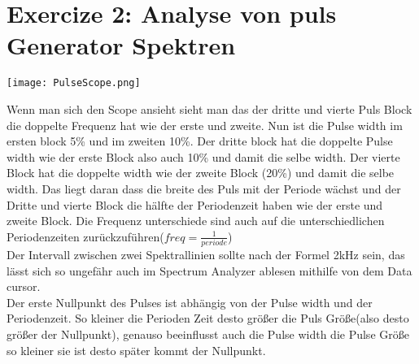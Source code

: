 \documentclass{scrartcl}
\begin{document}
\section*{Exercize 2: Analyse von puls Generator Spektren}

\texttt{[image: PulseScope.png]}

Wenn man sich den Scope ansieht sieht man das der dritte und vierte Puls Block die doppelte Frequenz hat wie der erste und zweite. Nun ist die Pulse width im ersten block 5\% und im zweiten 10\%. Der dritte block hat die doppelte Pulse width wie der erste Block also auch 10\% und damit die selbe width. Der vierte Block hat die doppelte width wie der zweite Block (20\%) und damit die selbe width. Das liegt daran dass die breite des Puls mit der Periode wächst und der Dritte und vierte Block die hälfte der Periodenzeit haben wie der erste und zweite Block. Die Frequenz unterschiede sind auch auf die unterschiedlichen Periodenzeiten zurückzuführen($freq = \frac1{periode}$) \\ 

Der Intervall zwischen zwei Spektrallinien sollte nach der Formel 2kHz sein, das lässt sich so ungefähr auch im Spectrum Analyzer ablesen mithilfe von dem Data cursor.\\ %
Der erste Nullpunkt des Pulses ist abhängig von der Pulse width und der Periodenzeit. So kleiner die Perioden Zeit desto größer die Puls Größe(also desto größer der Nullpunkt), genauso beeinflusst auch die Pulse width die Pulse Größe so kleiner sie ist desto später kommt der Nullpunkt.\\
\end{document}
